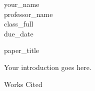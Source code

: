 \documentclass[12pt]{article}
\begin{document}
\begin{flushleft}
{{your_name}} \\
{{professor_name}} \\
{{class_full}} \\
{{due_date}}
\end{flushleft}

\begin{center}
{{paper_title}}
\end{center}


Your introduction goes here.

\begin{center}
Works Cited
\end{center}

\end{document}
